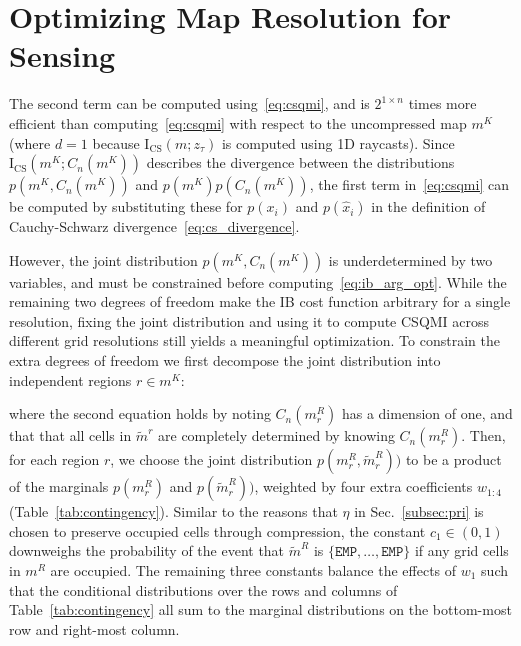 \section{Optimizing Map Resolution for Sensing}

The second term can be computed using~\eqref{eq:csqmi}, and is $2^{1\times n}$ times more efficient than computing~\eqref{eq:csqmi} with respect to the uncompressed map $m^{K}$ (where $d=1$ because $\text{I}_{\text{CS}}(m;z_{\tau})$ is computed using 1D raycasts). Since $\text{I}_{\text{CS}}(m^{K};C_{n}(m^{K}))$ describes the divergence between the distributions $p(m^{K},C_{n}(m^{K}))$ and $p(m^{K})p(C_{n}({m}^{K}))$, the first term in~\eqref{eq:csqmi} can be computed by substituting these for $p(x_i)$ and $p(\hat{x}_{i})$ in the definition of Cauchy-Schwarz divergence~\eqref{eq:cs_divergence}.

However, the joint distribution $p(m^{K},C_{n}(m^{K}))$ is underdetermined by two variables, and must be constrained before computing~\eqref{eq:ib_arg_opt}. While the remaining two degrees of freedom make the IB cost function arbitrary for a single resolution, fixing the joint distribution and using it to compute CSQMI across different grid resolutions still yields a meaningful optimization. To constrain the extra degrees of freedom we first decompose the joint distribution into independent regions $r \in m^{K}$:
%

where the second equation holds by noting $C_{n}(m^{R}_{r})$ has a dimension of one, and that that all cells in $\tilde{m}^{r}$ are completely determined by knowing $C_{n}(m^{R}_{r})$. Then, for each region $r$, we choose the joint distribution $p(m^{R}_{r},\tilde{m}^{R}_{r}))$ to be a product of the marginals $p(m^{R}_{r})$ and $p(\tilde{m}^R_{r}))$, weighted by four extra coefficients $w_{1:4}$ (Table~\ref{tab:contingency}). Similar to the reasons that $\eta$ in Sec.~\ref{subsec:pri} is chosen to preserve occupied cells through compression, the constant $c_1 \in (0, 1)$ downweighs the probability of the event that $\tilde{m}^{R}$ is $\{\texttt{EMP},\dots,\texttt{EMP}\}$ if any grid cells in $m^{R}$ are occupied. The remaining three constants balance the effects of $w_{1}$ such that the conditional distributions over the rows and columns of Table~\ref{tab:contingency} all sum to the marginal distributions on the bottom-most row and right-most column.

